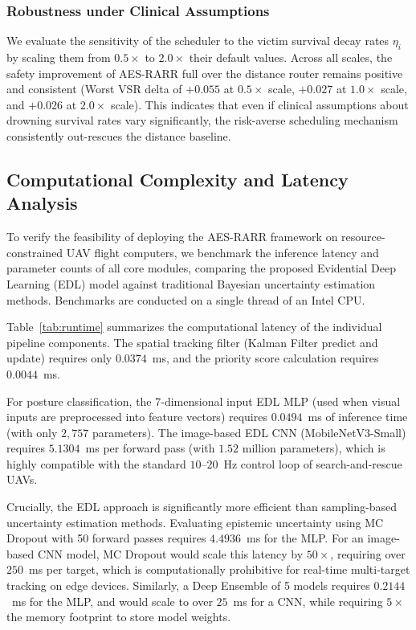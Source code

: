 \documentclass[runningheads]{llncs}
\newcommand{\aes}{AES-RARR}
\begin{document}
\subsubsection{Robustness under Clinical Assumptions}
We evaluate the sensitivity of the scheduler to the victim survival decay rates $\eta_i$ by scaling them from $0.5\times$ to $2.0\times$ their default values. Across all scales, the safety improvement of \aes{} full over the distance router remains positive and consistent (Worst VSR delta of $+0.055$ at $0.5\times$ scale, $+0.027$ at $1.0\times$ scale, and $+0.026$ at $2.0\times$ scale). This indicates that even if clinical assumptions about drowning survival rates vary significantly, the risk-averse scheduling mechanism consistently out-rescues the distance baseline.

\subsection{Computational Complexity and Latency Analysis}

To verify the feasibility of deploying the \aes{} framework on resource-constrained UAV flight computers, we benchmark the inference latency and parameter counts of all core modules, comparing the proposed Evidential Deep Learning (EDL) model against traditional Bayesian uncertainty estimation methods. Benchmarks are conducted on a single thread of an Intel CPU.

Table~\ref{tab:runtime} summarizes the computational latency of the individual pipeline components. The spatial tracking filter (Kalman Filter predict and update) requires only $0.0374$~ms, and the priority score calculation requires $0.0044$~ms. 

For posture classification, the 7-dimensional input EDL MLP (used when visual inputs are preprocessed into feature vectors) requires $0.0494$~ms of inference time (with only $2,757$ parameters). The image-based EDL CNN (MobileNetV3-Small) requires $5.1304$~ms per forward pass (with $1.52$ million parameters), which is highly compatible with the standard $10$--$20$~Hz control loop of search-and-rescue UAVs.

Crucially, the EDL approach is significantly more efficient than sampling-based uncertainty estimation methods. Evaluating epistemic uncertainty using MC Dropout with 50 forward passes requires $4.4936$~ms for the MLP. For an image-based CNN model, MC Dropout would scale this latency by $50\times$, requiring over $250$~ms per target, which is computationally prohibitive for real-time multi-target tracking on edge devices. Similarly, a Deep Ensemble of 5 models requires $0.2144$~ms for the MLP, and would scale to over $25$~ms for a CNN, while requiring $5\times$ the memory footprint to store model weights. 
\end{document}
